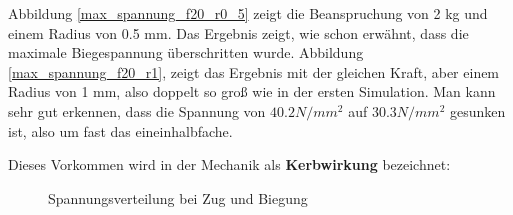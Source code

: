 	Abbildung \ref{max_spannung_f20_r0_5} zeigt die Beanspruchung von 2 kg und einem Radius von 0.5 mm.
	Das Ergebnis zeigt, wie schon erwähnt, dass die maximale Biegespannung überschritten wurde.
	Abbildung \ref{max_spannung_f20_r1}, zeigt das Ergebnis mit der gleichen Kraft, aber einem Radius von 1 mm, also doppelt so groß wie in der ersten Simulation.
	Man kann sehr gut erkennen, dass die Spannung von $40.2 N/mm^{2}$ auf $30.3 N/mm^{2}$ gesunken ist, also um fast das eineinhalbfache.

			\newpage

	Dieses Vorkommen wird in der Mechanik als \textbf{Kerbwirkung} bezeichnet:

			\begin{figure}[H]
				\begin{centering}
				\par\end{centering}
				\caption[Spannungsverteilung bei Zug und Biegung]{Spannungsverteilung bei Zug und Biegung\cite{spannungsverteilung}}
				\label{spannungsverteilung_ohne_kerbe}
			\end{figure}

